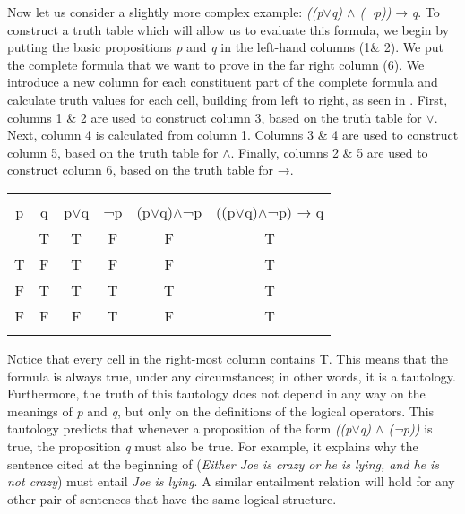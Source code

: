 Now let us consider a slightly more complex example: \textit{((p$\vee$q) $\wedge$ (¬p))} → \textit{q}. To construct a truth table which will allow us to evaluate this formula, we begin by putting the basic propositions \textit{p} and \textit{q} in the left-hand columns (1\& 2). We put the complete formula that we want to prove in the far right column (6). We introduce a new column for each constituent part of the complete formula and calculate truth values for each cell, building from left to right, as seen in . First, columns 1 \& 2 are used to construct column 3, based on the truth table for \textit{$\vee$}. Next, column 4 is calculated from column 1. Columns 3 \& 4 are used to construct column 5, based on the truth table for \textit{$\wedge$}. Finally, columns 2 \& 5 are used to construct column 6, based on the truth table for →.


\ea \label{ex:4.14}
\begin{tabular}[t]{*{6}{>{\sffamily}c}}
\lsptoprule
\tablehead{ 1 & 2 & 3 & 4 & 5 & 6 \\
 p & q & p$\vee$q & ¬p & (p$\vee$q)$\wedge$¬p & ((p$\vee$q)$\wedge$¬p) → q\\\midrule
}
 \sffamily T & \sffamily T & \sffamily T & \sffamily F & \sffamily F & \sffamily T\\
 \sffamily T & \sffamily F & \sffamily T & \sffamily F & \sffamily F & \sffamily T\\
 \sffamily F & \sffamily T & \sffamily T & \sffamily T & \sffamily T & \sffamily T\\
 \sffamily F & \sffamily F & \sffamily F & \sffamily T & \sffamily F & \sffamily T\\
\lspbottomrule
\end{tabular}
\z

Notice that every cell in the right-most column contains T. This means that the formula is always true, under any circumstances; in other words, it is a tautology. Furthermore, the truth of this tautology does not depend in any way on the meanings of \textit{p} and \textit{q}, but only on the definitions of the logical operators. This tautology predicts that whenever a proposition of the form \textit{((p$\vee$q) $\wedge$ (¬p))} is true, the proposition \textit{q} must also be true. For example, it explains why the sentence cited at the beginning of  (\textit{Either Joe is crazy or he is lying, and he is not crazy}) must entail \textit{Joe is lying}. A similar entailment relation will hold for any other pair of sentences that have the same logical structure.



